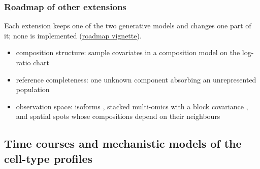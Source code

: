 \documentclass[pdflatex, sn-nature]{sn-jnl}
\theoremstyle{thmstyleone}%
\theoremstyle{thmstyletwo}%
\theoremstyle{thmstylethree}%
\newcommand{\vignette}[2]{\href{https://bastienchassagnol.github.io/DeCovarT/articles/#1}{#2}}
\begin{document}
\subsubsection{Roadmap of other extensions}
\label{sec:roadmap}

Each extension keeps one of the two generative models and changes one part of it; none is implemented
(\vignette{05-3-extensions-roadmap.html}{roadmap vignette}).

\begin{itemize}
  \item composition structure: sample covariates in a composition model on the log-ratio chart
        \cite{fanMusic2CellTypeDeconvolution2022}
  \item reference completeness: one unknown component absorbing an unrepresented population
        \cite{taiBayiceBayesianHierarchicalModel2021,montierthDeconvolutionSparsecountRNA2025,racleSimultaneousEnumerationCancer2017}
  \item observation space: isoforms \cite{heilingEstimatingCellTypeComposition2023}, stacked multi-omics with a
        block covariance \cite{chenUnicoUnifiedModelCell2025,barbotPromisesLimitsMultimodal2026}, and spatial spots
        whose compositions depend on their neighbours \cite{cableRobustDecompositionCell2022a}
\end{itemize}

\subsection{Time courses and mechanistic models of the cell-type profiles}
\label{sec:dynamic-inference}
\end{document}
